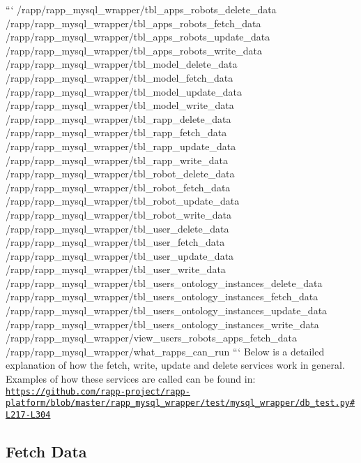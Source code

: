 ``` /rapp/rapp\-\_\-mysql\-\_\-wrapper/tbl\-\_\-apps\-\_\-robots\-\_\-delete\-\_\-data /rapp/rapp\-\_\-mysql\-\_\-wrapper/tbl\-\_\-apps\-\_\-robots\-\_\-fetch\-\_\-data /rapp/rapp\-\_\-mysql\-\_\-wrapper/tbl\-\_\-apps\-\_\-robots\-\_\-update\-\_\-data /rapp/rapp\-\_\-mysql\-\_\-wrapper/tbl\-\_\-apps\-\_\-robots\-\_\-write\-\_\-data /rapp/rapp\-\_\-mysql\-\_\-wrapper/tbl\-\_\-model\-\_\-delete\-\_\-data /rapp/rapp\-\_\-mysql\-\_\-wrapper/tbl\-\_\-model\-\_\-fetch\-\_\-data /rapp/rapp\-\_\-mysql\-\_\-wrapper/tbl\-\_\-model\-\_\-update\-\_\-data /rapp/rapp\-\_\-mysql\-\_\-wrapper/tbl\-\_\-model\-\_\-write\-\_\-data /rapp/rapp\-\_\-mysql\-\_\-wrapper/tbl\-\_\-rapp\-\_\-delete\-\_\-data /rapp/rapp\-\_\-mysql\-\_\-wrapper/tbl\-\_\-rapp\-\_\-fetch\-\_\-data /rapp/rapp\-\_\-mysql\-\_\-wrapper/tbl\-\_\-rapp\-\_\-update\-\_\-data /rapp/rapp\-\_\-mysql\-\_\-wrapper/tbl\-\_\-rapp\-\_\-write\-\_\-data /rapp/rapp\-\_\-mysql\-\_\-wrapper/tbl\-\_\-robot\-\_\-delete\-\_\-data /rapp/rapp\-\_\-mysql\-\_\-wrapper/tbl\-\_\-robot\-\_\-fetch\-\_\-data /rapp/rapp\-\_\-mysql\-\_\-wrapper/tbl\-\_\-robot\-\_\-update\-\_\-data /rapp/rapp\-\_\-mysql\-\_\-wrapper/tbl\-\_\-robot\-\_\-write\-\_\-data /rapp/rapp\-\_\-mysql\-\_\-wrapper/tbl\-\_\-user\-\_\-delete\-\_\-data /rapp/rapp\-\_\-mysql\-\_\-wrapper/tbl\-\_\-user\-\_\-fetch\-\_\-data /rapp/rapp\-\_\-mysql\-\_\-wrapper/tbl\-\_\-user\-\_\-update\-\_\-data /rapp/rapp\-\_\-mysql\-\_\-wrapper/tbl\-\_\-user\-\_\-write\-\_\-data /rapp/rapp\-\_\-mysql\-\_\-wrapper/tbl\-\_\-users\-\_\-ontology\-\_\-instances\-\_\-delete\-\_\-data /rapp/rapp\-\_\-mysql\-\_\-wrapper/tbl\-\_\-users\-\_\-ontology\-\_\-instances\-\_\-fetch\-\_\-data /rapp/rapp\-\_\-mysql\-\_\-wrapper/tbl\-\_\-users\-\_\-ontology\-\_\-instances\-\_\-update\-\_\-data /rapp/rapp\-\_\-mysql\-\_\-wrapper/tbl\-\_\-users\-\_\-ontology\-\_\-instances\-\_\-write\-\_\-data /rapp/rapp\-\_\-mysql\-\_\-wrapper/view\-\_\-users\-\_\-robots\-\_\-apps\-\_\-fetch\-\_\-data /rapp/rapp\-\_\-mysql\-\_\-wrapper/what\-\_\-rapps\-\_\-can\-\_\-run ``` Below is a detailed explanation of how the fetch, write, update and delete services work in general. Examples of how these services are called can be found in\-: \href{https://github.com/rapp-project/rapp-platform/blob/master/rapp_mysql_wrapper/test/mysql_wrapper/db_test.py#L217-L304}{\tt https\-://github.\-com/rapp-\/project/rapp-\/platform/blob/master/rapp\-\_\-mysql\-\_\-wrapper/test/mysql\-\_\-wrapper/db\-\_\-test.\-py\#\-L217-\/\-L304}

\subsection*{Fetch Data}

